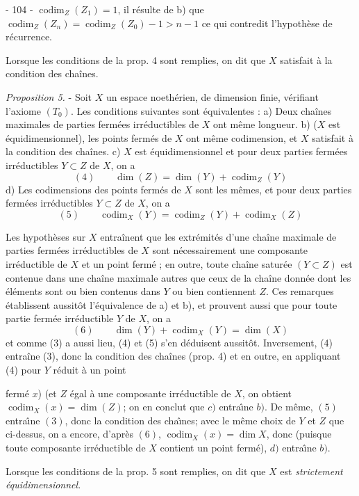 - 104 -
$\operatorname{codim}_{Z}(Z_1) = 1$, il résulte de b) que $\operatorname{codim}_{Z}(Z_n) = \operatorname{codim}_{Z}(Z_0) - 1 > n - 1$ ce qui contredit l'hypothèse de récurrence.

Lorsque les conditions de la prop. 4 sont remplies, on dit que $X$ satisfait à la condition des chaînes.

\emph{Proposition 5.} - Soit $X$ un espace noethérien, de dimension finie, vérifiant l'axiome $(T_0)$. Les conditions suivantes sont équivalentes :
a) Deux chaînes maximales de parties fermées irréductibles de $X$ ont même longueur.
b) ($X$ est équidimensionnel), les points fermés de $X$ ont même codimension, et $X$ satisfait à la condition des chaînes.
c) $X$ est équidimensionnel et pour deux parties fermées irréductibles $Y \subset Z$ de $X$, on a
$$(4) \qquad \dim(Z) = \dim(Y) + \operatorname{codim}_{Z}(Y)$$
d) Les codimensions des points fermés de $X$ sont les mêmes, et pour deux parties fermées irréductibles $Y \subset Z$ de $X$, on a
$$(5) \qquad \operatorname{codim}_{X}(Y) = \operatorname{codim}_{Z}(Y) + \operatorname{codim}_{X}(Z)$$

Les hypothèses sur $X$ entraînent que les extrémités d'une chaîne maximale de parties fermées irréductibles de $X$ sont nécessairement une composante irréductible de $X$ et un point fermé ; en outre, toute chaîne saturée $(Y \subset Z)$ est contenue dans une chaîne maximale autres que ceux de la chaîne donnée dont les éléments sont ou bien contenus dans $Y$ ou bien contiennent $Z$. Ces remarques établissent aussitôt l'équivalence de a) et b), et prouvent aussi que pour toute partie fermée irréductible $Y$ de $X$, on a
$$(6) \qquad \dim(Y) + \operatorname{codim}_{X}(Y) = \dim(X)$$
et comme (3) a aussi lieu, (4) et (5) s'en déduisent aussitôt. Inversement, (4) entraîne (3), donc la condition des chaînes (prop. 4) et en outre, en appliquant (4) pour $Y$ réduit à un point

\newpage


ferm\'e $x$)
(et $Z$ \'egal \`a une composante irr\'eductible de $X$, on obtient $\operatorname{codim}_X(x) = \dim(Z)$; on en conclut que $c)$ entra\^\i ne $b)$. De m\^eme, $(5)$ entra\^\i ne $(3)$, donc la condition des cha\^\i nes; avec le m\^eme choix de $Y$ et $Z$ que ci-dessus, on a encore, d'apr\`es $(6)$, $\operatorname{codim}_X(x) = \dim X$, donc (puisque toute composante irr\'eductible de $X$ contient un point ferm\'e), $d)$ entra\^\i ne $b)$.

Lorsque les conditions de la prop. 5 sont remplies, on dit que $X$ est \emph{strictement \'equidimensionnel}.

